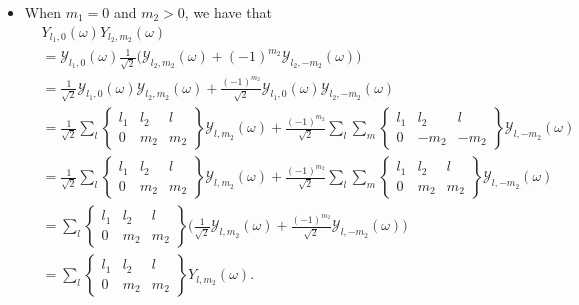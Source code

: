 \documentclass[10pt]{article}
\begin{document}
\begin{itemize}
		\item When $m_1 = 0$ and  $m_2 > 0$, we have that
		\begin{align*}
			& Y_{l_1, 0}(\omega) Y_{l_2, m_2}(\omega)\\
			&= \mathcal{Y}_{l_1, 0}(\omega) \frac{1}{\sqrt{2}} \bigg( \mathcal{Y}_{l_2, m_2}(\omega) + (-1)^{m_2} \mathcal{Y}_{l_2, -m_2}(\omega) \bigg) \\
			&= \frac{1}{\sqrt{2}} \mathcal{Y}_{l_1, 0}(\omega) \mathcal{Y}_{l_2, m_2}(\omega) + 
			\frac{(-1)^{m_2}}{\sqrt{2}} \mathcal{Y}_{l_1, 0}(\omega) \mathcal{Y}_{l_2, -m_2}(\omega) \\
			&= \frac{1}{\sqrt{2}} \sum_l \begin{Bmatrix}
				l_1 & l_2 & l \\ 0 & m_2 & m_2
			\end{Bmatrix}
			\mathcal{Y}_{l,m_2}(\omega) + 
			\frac{(-1)^{m_2}}{\sqrt{2}} \sum_l \sum_m \begin{Bmatrix}
				l_1 & l_2 & l \\ 0 & -m_2 & -m_2
			\end{Bmatrix}
			\mathcal{Y}_{l,-m_2}(\omega) \\
			&= \frac{1}{\sqrt{2}} \sum_l \begin{Bmatrix}
				l_1 & l_2 & l \\ 0 & m_2 & m_2
			\end{Bmatrix}
			\mathcal{Y}_{l,m_2}(\omega) + 
			\frac{(-1)^{m_2}}{\sqrt{2}} \sum_l \sum_m \begin{Bmatrix}
				l_1 & l_2 & l \\ 0 & m_2 & m_2
			\end{Bmatrix}
			\mathcal{Y}_{l,-m_2}(\omega) \\
			&= \sum_l \begin{Bmatrix}
				l_1 & l_2 & l \\ 0 & m_2 & m_2
			\end{Bmatrix}
			\bigg( \frac{1}{\sqrt{2}}  \mathcal{Y}_{l,m_2}(\omega) + \frac{(-1)^{m_2}}{\sqrt{2}} \mathcal{Y}_{l,-m_2}(\omega)  \bigg)\\
			&= \sum_l \begin{Bmatrix}
				l_1 & l_2 & l \\ 0 & m_2 & m_2
			\end{Bmatrix}
			Y_{l,m_2}(\omega).
		\end{align*}


\end{itemize}
\end{document}
